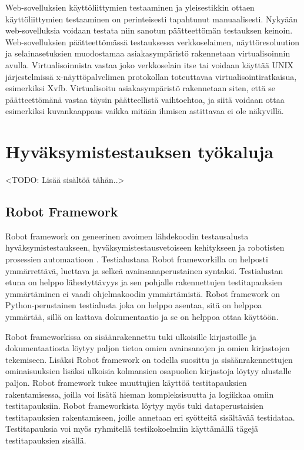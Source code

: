   Web-sovelluksien käyttöliittymien testaaminen ja yleisestikkin ottaen käyttöliittymien testaaminen on perinteisesti tapahtunut manuaalisesti.
  Nykyään web-sovelluksia voidaan testata niin sanotun päätteettömän testauksen keinoin.
  Web-sovelluksien päätteettömässä testauksessa verkkoselaimen, näyttöresoluution ja selainasetuksien muodostamaa asiakasympäristö rakennetaan virtualisoinnin avulla.
  Virtualisoinnista vastaa joko verkkoselain itse tai voidaan käyttää UNIX järjestelmissä x-näyttöpalvelimen protokollan toteuttavaa virtualisointiratkaisua, esimerkiksi Xvfb.
  Virtualisoitu asiakasympäristö rakennetaan siten, että se päätteettömänä vastaa täysin päätteellistä vaihtoehtoa, ja siitä voidaan ottaa esimerkiksi kuvankaappaus vaikka mitään ihmisen astittavaa ei ole näkyvillä.

\section{Hyväksymistestauksen työkaluja} \label{ch:08_hyvaksymistestauksen_tyokaluja}

  <TODO: Lisää sisältöä tähän..>

  \subsection{Robot Framework} \label{ch:08_robot_framework}

    Robot framework on geneerinen avoimen lähdekoodin testausalusta hyväksymistestaukseen, hyväksymistestausvetoiseen kehitykseen ja robotisten prosessien automaatioon \parencite{noauthor_robot_nodate}.
    Testialustana Robot frameworkilla on helposti ymmärrettävä, luettava ja selkeä avainsanaperustainen syntaksi.
    Testialustan etuna on helppo lähestyttävyys ja sen pohjalle rakennettujen testitapauksien ymmärtäminen ei vaadi ohjelmakoodin ymmärtämistä.
    Robot framework on Python-perustainen testialusta joka on helppo asentaa, sitä on helppoa ymmärtää, sillä on kattava dokumentaatio ja se on helppoa ottaa käyttöön.

    Robot frameworkissa on sisäänrakennettu tuki ulkoisille kirjastoille ja dokumentaatiosta löytyy paljon tietoa omien avainsanojen ja omien kirjastojen tekemiseen.
    Lisäksi Robot framework on todella suosittu ja sisäänrakennettujen ominaisuuksien lisäksi ulkoisia kolmansien osapuolien kirjastoja löytyy alustalle paljon.
    Robot framework tukee muuttujien käyttöä testitapauksien rakentamisessa, joilla voi lisätä hieman kompleksisuutta ja logiikkaa omiin testitapauksiin.
    Robot frameworkista löytyy myös tuki dataperustaisien testitapauksien rakentamiseen, joille annetaan eri syötteitä sisältävää testidataa.
    Testitapauksia voi myös ryhmitellä testikokoelmiin käyttämällä tägejä testitapauksien sisällä.

